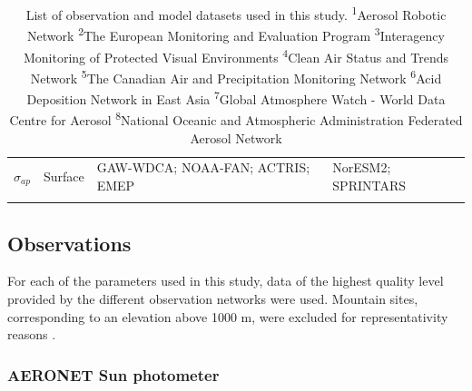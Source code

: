 \documentclass[journal abbreviation, manuscript]{copernicus}
\begin{document}
\begin{table}
\begin{tabularx}{\textwidth}{lllX}
  $\sigma_{ap}$  & Surface & GAW-WDCA; NOAA-FAN; ACTRIS; EMEP  & NorESM2; SPRINTARS                                                                                        \\
  \bottomhline
 \end{tabularx}
 \caption{List of observation and model datasets used in this study.
 \textsuperscript{1}Aerosol Robotic Network
 \textsuperscript{2}The European Monitoring and Evaluation Program
 \textsuperscript{3}Interagency Monitoring of Protected Visual Environments
 \textsuperscript{4}Clean Air Status and Trends Network
 \textsuperscript{5}The Canadian Air and Precipitation Monitoring Network
 \textsuperscript{6}Acid Deposition Network in East Asia
 \textsuperscript{7}Global Atmosphere Watch - World Data Centre for Aerosol
 \textsuperscript{8}National Oceanic and Atmospheric Administration Federated Aerosol Network
 }
 \label{table:datasets}
\end{table}

\subsection{Observations}

For each of the parameters used in this study, data of the highest quality level provided by the different observation networks were used. Mountain sites, corresponding to an elevation above 1000 m, were excluded for representativity reasons \citep{kinne2013mac}.

\subsubsection{AERONET Sun photometer}
\end{document}
